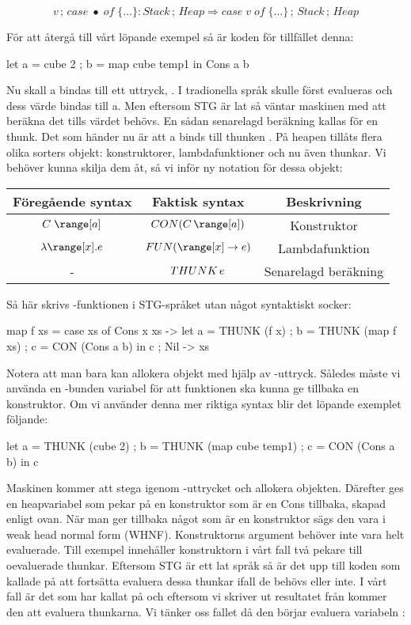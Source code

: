 \documentclass[../Core]{subfiles}
\begin{document}
\[
v\,;\, case\;\bullet\; of\;\{\ldots\}:Stack\,;\, Heap\Rightarrow case\; v\; of\;\{\ldots\}\,;\, Stack\,;\, Heap\]


För att återgå till vårt löpande exempel så är koden för tillfället denna:

\begin{codeEx}
let { a = cube 2
    ; b = map cube temp1
    } in Cons a b
\end{codeEx}

Nu skall a bindas till ett uttryck, . I tradionella språk skulle
 först evalueras och dess värde bindas till a. Men eftersom STG
är lat så väntar maskinen med att beräkna det tills värdet behövs.
En sådan senarelagd beräkning kallas för en thunk. Det som händer nu är att
a binds till thunken . På heapen tillåts flera olika
sorters objekt: konstruktorer, lambdafunktioner och nu även thunkar.
Vi behöver kunna skilja dem åt, så vi inför ny notation för dessa objekt:

\begin{tabular}{ccc}
Föregående syntax & Faktisk syntax & Beskrivning\tabularnewline
\hline
$C\;\range[a]$ & $\CON C{\range[a]}$ & Konstruktor\tabularnewline
$\lambda\range[x].e$ & $\FUN{\range[x]}e$ & Lambdafunktion\tabularnewline
- & $THUNK\,e$ & Senarelagd beräkning\tabularnewline
\end{tabular}

Så här skrivs -funktionen i STG-språket utan något syntaktiskt socker:

\begin{codeEx}
map f xs = case xs of
    { Cons x xs -> let { a = THUNK (f x)
                       ; b = THUNK (map f xs)
                       ; c = CON (Cons a b)
                       } in c
    ; Nil       -> xs
    }
\end{codeEx}

Notera att man bara kan allokera objekt med hjälp av -uttryck. Således
måste vi använda en -bunden variabel  för att funktionen ska kunna ge tillbaka en konstruktor.
Om vi använder denna mer riktiga syntax blir det löpande exemplet följande:

\begin{codeEx}
let { a = THUNK (cube 2)
    ; b = THUNK (map cube temp1)
    ; c = CON (Cons a b)
    } in c
\end{codeEx}

Maskinen kommer att stega igenom -uttrycket och allokera objekten.
Därefter ges en heapvariabel som pekar på en konstruktor
som är en Cons tillbaka, skapad enligt ovan. När man ger tillbaka något som är
en konstruktor sägs den vara i weak head normal form (WHNF). Konstruktorns
argument behöver inte vara helt evaluerade. Till exempel innehåller konstruktorn i vårt fall
två pekare till oevaluerade thunkar. Eftersom STG är ett
lat språk så är det upp till koden som kallade på  att fortsätta
evaluera dessa thunkar ifall de behövs eller inte. I vårt fall är
det  som har kallat på  och eftersom vi skriver ut resultatet från 
kommer den att evaluera thunkarna. Vi tänker oss fallet då den börjar evaluera variabeln :
\end{document}
